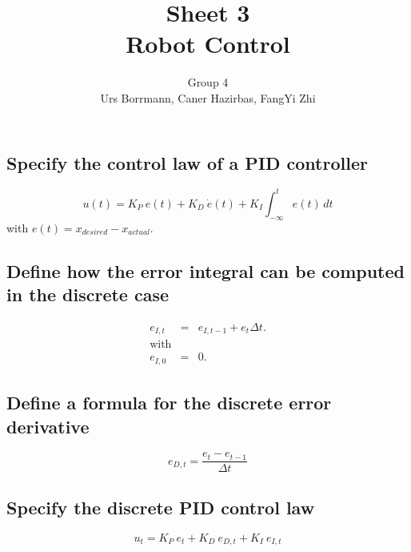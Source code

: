 \documentclass[14pt,a4paper]{article}
\title{\textbf{Sheet 3} \\  \textbf{Robot Control}}
\author{Group 4 \\Urs Borrmann, Caner Hazirbas, FangYi Zhi}
\begin{document}
\maketitle
\onehalfspacing

\section{}
	\subsection{Specify the control law of a PID controller}
	$$
		u(t)=K_P \  e(t) + K_D \ \dot{e}(t) + K_I \int_{-\infty}^t e(t)\,dt
	$$
		with $e(t)=x_{desired}-x_{actual}$.
	\subsection{Define how the error integral can be computed in the discrete case}
	\begin{eqnarray*}
		e_{I,t}&=&e_{I,t-1}+e_{t}\Delta t. \\
		\text{with}\\
		e_{I,0}&=&0.
	\end{eqnarray*}
	
	\subsection{Define a formula for the discrete error derivative}
	$$
		e_{D,t}=\frac{ e_t - e_{t-1}}{\Delta t}
	$$
	
	\subsection{Specify the discrete PID control law}
	$$
		u_t=K_P \ e_t + K_D \ e_{D,t}+K_I \ e_{I,t}
	$$
	
\end{document}
